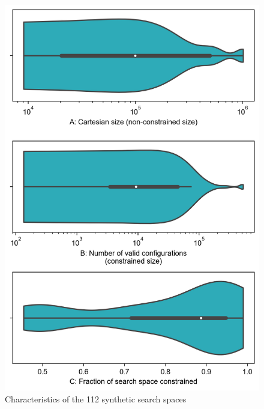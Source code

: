 \begin{figure}[!htb]
    \centering
    \includegraphics[width=0.95\linewidth]{ics25template/figures/searchspace_construction/results_synthetic_violin.png}
    \caption{Characteristics of the 112 synthetic search spaces}
    \label{fig:searchspaces_synthetic_characteristics}
\end{figure}

